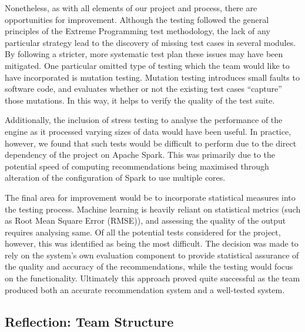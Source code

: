 \documentclass{l3proj}
\begin{document}
Nonetheless, as with all elements of our project and process, there are opportunities for improvement. Although the testing followed the general principles of the Extreme Programming test methodology, the lack of any particular strategy lead to the discovery of missing test cases in several modules. By following a stricter, more systematic test plan these issues may have been mitigated. One particular omitted type of testing which the team would like to have incorporated is mutation testing. Mutation testing introduces small faults to software code, and evaluates whether or not the existing test cases “capture” those mutations. In this way, it helps to verify the quality of the test suite.

Additionally, the inclusion of stress testing to analyse the performance of the engine as it processed varying sizes of data would have been useful. In practice, however, we found that such tests would be difficult to perform due to the direct dependency of the project on Apache Spark. This was primarily due to the potential speed of computing recommendations being maximised through alteration of the configuration of Spark to use multiple cores.  

The final area for improvement would be to incorporate statistical measures into the testing process. Machine learning is heavily reliant on statistical metrics (such as Root Mean Square Error (RMSE)), and assessing the quality of the output requires analysing same. Of all the potential tests considered for the project, however, this was identified as being the most difficult. The decision was made to rely on the system’s own evaluation component to provide statistical assurance of the quality and accuracy of the recommendations, while the testing would focus on the functionality. Ultimately this approach proved quite successful as the team produced both an accurate recommendation system and a well-tested system.


\subsection{Reflection: Team Structure}
\label{sec:teamstructure}

\end{document}
